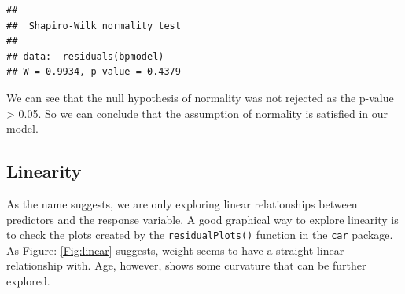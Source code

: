 \documentclass[11pt, letterpaper, twoside]{memoir}\usepackage{knitr}
\begin{document}
\begin{knitrout}
\color{fgcolor}\begin{kframe}
\begin{alltt}
\hlstd{(}
\end{alltt}
\begin{verbatim}
## 
## 	Shapiro-Wilk normality test
## 
## data:  residuals(bpmodel)
## W = 0.9934, p-value = 0.4379
\end{verbatim}
\end{kframe}
\end{knitrout}

We can see that the null hypothesis of normality was not rejected as the p-value > 0.05. So we can conclude that the assumption of normality is satisfied in our model. 

\subsection{Linearity}

As the name suggests, we are only exploring linear relationships between predictors and the response variable. A good graphical way to explore linearity is to check the plots created by the \texttt{residualPlots()}  function in the \texttt{car}  package. As Figure: \ref{Fig:linear} suggests, weight seems to have a straight linear relationship with. Age, however, shows some curvature that can be further explored.
\end{document}
